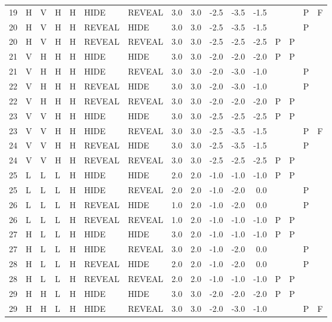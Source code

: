 \begin{longtable}{lllllllrrrrrllll}
  19 & H & V & H & H & HIDE & REVEAL & 3.0 & 3.0 & -2.5 & -3.5 & -1.5 &  &  & P & F \\ 
  20 & H & V & H & H & REVEAL & HIDE & 3.0 & 3.0 & -2.5 & -3.5 & -1.5 &  &  & P &  \\ 
  20 & H & V & H & H & REVEAL & REVEAL & 3.0 & 3.0 & -2.5 & -2.5 & -2.5 & P & P &  &  \\ 
  21 & V & H & H & H & HIDE & HIDE & 3.0 & 3.0 & -2.0 & -2.0 & -2.0 & P & P &  &  \\ 
  21 & V & H & H & H & HIDE & REVEAL & 3.0 & 3.0 & -2.0 & -3.0 & -1.0 &  &  & P &  \\ 
  22 & V & H & H & H & REVEAL & HIDE & 3.0 & 3.0 & -2.0 & -3.0 & -1.0 &  &  & P &  \\ 
  22 & V & H & H & H & REVEAL & REVEAL & 3.0 & 3.0 & -2.0 & -2.0 & -2.0 & P & P &  &  \\ 
  23 & V & V & H & H & HIDE & HIDE & 3.0 & 3.0 & -2.5 & -2.5 & -2.5 & P & P &  &  \\ 
  23 & V & V & H & H & HIDE & REVEAL & 3.0 & 3.0 & -2.5 & -3.5 & -1.5 &  &  & P & F \\ 
  24 & V & V & H & H & REVEAL & HIDE & 3.0 & 3.0 & -2.5 & -3.5 & -1.5 &  &  & P &  \\ 
  24 & V & V & H & H & REVEAL & REVEAL & 3.0 & 3.0 & -2.5 & -2.5 & -2.5 & P & P &  &  \\ 
  25 & L & L & L & H & HIDE & HIDE & 2.0 & 2.0 & -1.0 & -1.0 & -1.0 & P & P &  &  \\ 
  25 & L & L & L & H & HIDE & REVEAL & 2.0 & 2.0 & -1.0 & -2.0 & 0.0 &  &  & P &  \\ 
  26 & L & L & L & H & REVEAL & HIDE & 1.0 & 2.0 & -1.0 & -2.0 & 0.0 &  &  & P &  \\ 
  26 & L & L & L & H & REVEAL & REVEAL & 1.0 & 2.0 & -1.0 & -1.0 & -1.0 & P & P &  &  \\ 
  27 & H & L & L & H & HIDE & HIDE & 3.0 & 2.0 & -1.0 & -1.0 & -1.0 & P & P &  &  \\ 
  27 & H & L & L & H & HIDE & REVEAL & 3.0 & 2.0 & -1.0 & -2.0 & 0.0 &  &  & P &  \\ 
  28 & H & L & L & H & REVEAL & HIDE & 2.0 & 2.0 & -1.0 & -2.0 & 0.0 &  &  & P &  \\ 
  28 & H & L & L & H & REVEAL & REVEAL & 2.0 & 2.0 & -1.0 & -1.0 & -1.0 & P & P &  &  \\ 
  29 & H & H & L & H & HIDE & HIDE & 3.0 & 3.0 & -2.0 & -2.0 & -2.0 & P & P &  &  \\ 
  29 & H & H & L & H & HIDE & REVEAL & 3.0 & 3.0 & -2.0 & -3.0 & -1.0 &  &  & P & F \\ 

\end{longtable}
